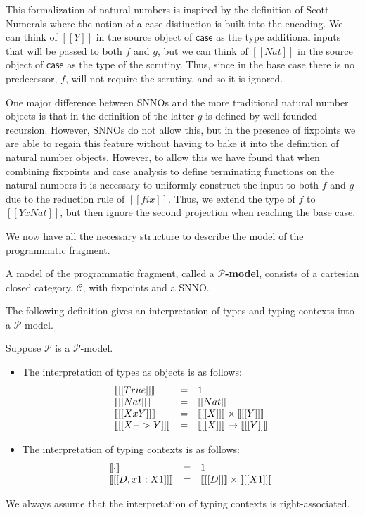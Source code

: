 \documentclass{article}
\let\to\rightarrow
\newcommand{\cat}[1]{\mathcal{#1}}
\newcommand{\case}[0]{\mathsf{case}}
\begin{document}
\noindent This formalization of natural numbers is inspired by the
definition of Scott Numerals \cite{??} where the notion of a case
distinction is built into the encoding. We can think of $[[Y]]$ in the
source object of $\case$ as the type additional inputs that will be
passed to both $f$ and $g$, but we can think of $[[Nat]]$ in the
source object of $\case$ as the type of the scrutiny.  Thus, since in
the base case there is no predecessor, $f$, will not require the
scrutiny, and so it is ignored.  

One major difference between SNNOs and the more traditional natural
number objects is that in the definition of the latter $g$ is defined
by well-founded recursion.  However, SNNOs do not allow this, but in
the presence of fixpoints we are able to regain this feature without
having to bake it into the definition of natural number objects.
However, to allow this we have found that when combining fixpoints and
case analysis to define terminating functions on the natural numbers
it is necessary to uniformly construct the input to both $f$ and $g$
due to the reduction rule of $[[fix]]$.  Thus, we extend the type of
$f$ to $[[Y x Nat]]$, but then ignore the second projection when
reaching the base case.

We now have all the necessary structure to describe the model of the
programmatic fragment.
\begin{definition}
  \label{def:P-model}
  A model of the programmatic fragment, called a
  \textbf{$\cat{P}$-model}, consists of a cartesian closed category,
  $\cat{C}$, with fixpoints and a SNNO.
\end{definition}
\noindent
The following definition gives an interpretation of types and typing
contexts into a $\cat{P}$-model.
\begin{definition}
  \label{def:term-interp}
  Suppose $\cat{P}$ is a $\cat{P}$-model.
  \begin{itemize}
  \item The interpretation of types as objects is as follows:
    \[
    \begin{array}{lll}
      \interp{[[True]]} & = & 1\\
      \interp{[[Nat]]} & = & [[Nat]]\\
      \interp{[[X x Y]]} & = & \interp{[[X]]} \times \interp{[[Y]]}\\
      \interp{[[X -> Y]]} & = & \interp{[[X]]} \to \interp{[[Y]]}\\      
    \end{array}
    \]

  \item The interpretation of typing contexts is as follows:
    \[
    \begin{array}{lll}
      \llbracket \cdot \rrbracket & = & 1\\
      \llbracket [[D,x1 : X1]] \rrbracket & = &
      \llbracket [[D]] \rrbracket \times \llbracket [[X1]] \rrbracket\\
    \end{array}
    \]
  \end{itemize}
  We always assume that the interpretation of typing contexts is
  right-associated.  
\end{definition}
\end{document}
